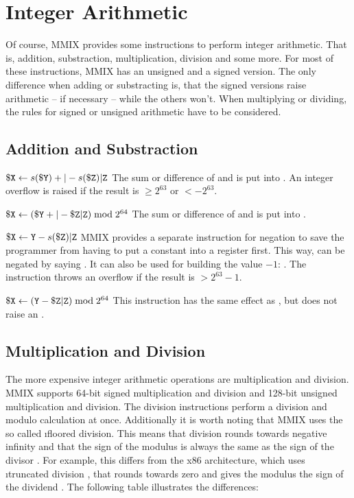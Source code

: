\section{Integer Arithmetic}

Of course, MMIX provides some instructions to perform integer arithmetic. That is, addition, substraction, multiplication, division and some more. For most of these instructions, MMIX has an unsigned and a signed version. The only difference when adding or substracting is, that the signed versions raise arithmetic  -- if necessary -- while the others won't. When multiplying or dividing, the rules for signed or unsigned arithmetic have to be considered.

\subsection{Addition and Substraction}

\instrtbl
	{}
	{${\tt \$X} \leftarrow s({\tt \$Y}) +|- s({\tt \$Z}){\tt|Z}$}
\noindent The sum or difference of  and  is put into . An integer overflow  is raised if the result is $\ge 2^{63}$ or $< -2^{63}$. \citep[pg. 6]{mmix-doc}

\instrtbl
	{}
	{${\tt \$X} \leftarrow ({\tt \$Y} +|- {\tt \$Z}{\tt|Z}) \bmod 2^{64}$}
\noindent The sum or difference of  and  is put into . \citep[pg. 6]{mmix-doc}

\instrtbl
	{}
	{${\tt \$X} \leftarrow {\tt Y} - s({\tt \$Z}){\tt|Z}$}
\noindent MMIX provides a separate instruction for negation to save the programmer from having to put a constant into a register first. This way, \eg {} can be negated by saying . It can also be used for building the value $-1$: . The instruction throws an overflow  if the result is $> 2^{63}-1$. \citep[pg. 6]{mmix-doc}

\instrtbl
	{}
	{${\tt \$X} \leftarrow ({\tt Y} - {\tt \$Z}{\tt|Z}) \bmod 2^{64}$}
\noindent This instruction has the same effect as , but does not raise an . \citep[pg. 6]{mmix-doc}

\subsection{Multiplication and Division}

The more expensive integer arithmetic operations are multiplication and division. MMIX supports 64-bit signed multiplication and division and 128-bit unsigned multiplication and division. The division instructions perform a division and modulo calculation at once. Additionally it is worth noting that MMIX uses the so called \i{floored division}. This means that division rounds towards negative infinity and that the sign of the modulus is always the same as the sign of the divisor \citep[pg. 2]{divmod}. For example, this differs from the x86 architecture, which uses \i{truncated division} \citep[pg. 560]{ia32-sdmv2a}, that rounds towards zero and gives the modulus the sign of the dividend \citep[pg. 2]{divmod}. The following table illustrates the differences:

